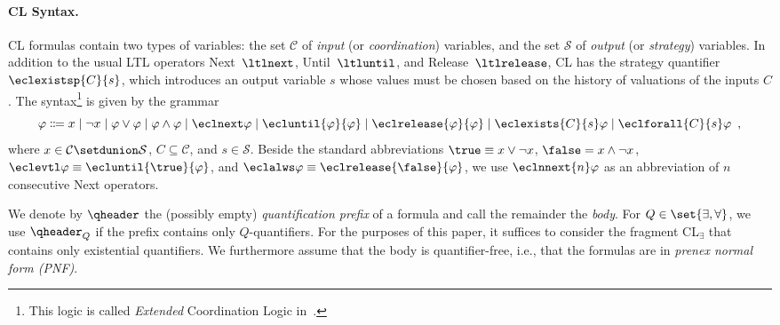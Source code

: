 \documentclass{LMCS}
\theoremstyle{plain}\newtheorem{theorem}[thm]{Theorem}
\theoremstyle{plain}\newtheorem{lemma}[thm]{Lemma}
\theoremstyle{plain}\newtheorem{proposition}[thm]{Proposition}
\theoremstyle{plain}\newtheorem{corollary}[thm]{Corollary}
\theoremstyle{definition}\newtheorem{definition}{Definition}[section]
\begin{document}
\paragraph{\bf CL Syntax.}
CL formulas contain two types of variables: the set $\mathcal{C}$ of \emph{input} (or \emph{coordination}) variables, and the set $\mathcal{S}$ of \emph{output} (or \emph{strategy}) variables.
In addition to the usual LTL operators Next~$\ltlnext$, Until~$\ltluntil$, and Release~$\ltlrelease$, CL has the strategy quantifier $\eclexistsp{C}{s}$, which introduces an output variable $s$ whose values must be chosen based on the history of valuations of the inputs $C$.
The syntax\footnote{This logic is called \emph{Extended} Coordination Logic in~\cite{DBLP:conf/csl/FinkbeinerS10}.} is given by the grammar
\begin{equation*} \label{eq:ecl_syntax}
\varphi \Coloneqq x \mid \neg x \mid \varphi \lor \varphi \mid \varphi \land \varphi \mid \eclnext \varphi \mid \ecluntil{\varphi}{\varphi} \mid \eclrelease{\varphi}{\varphi} \mid \eclexists{C}{s} \varphi \mid \eclforall{C}{s} \varphi \enspace ,
\end{equation*}
where $x \in \mathcal{C} \setdunion \mathcal{S}$, $C \subseteq \mathcal{C}$, and $s \in \mathcal{S}$.
Beside the standard abbreviations $\true \equiv x \lor \neg x$, $\false = x \land \neg x$, $\eclevtl \varphi \equiv \ecluntil{\true}{\varphi}$, and $\eclalws \varphi \equiv \eclrelease{\false}{\varphi}$, we use $\eclnnext{n} \varphi$ as an abbreviation of $n$ consecutive Next operators.

We denote by $\qheader$ the (possibly empty) \emph{quantification prefix} of a formula and call the remainder the \emph{body}.
For $Q \in \set{\exists,\forall}$, we use $\qheader_Q$ if the prefix contains only $Q$-quantifiers.
For the purposes of this paper, it suffices to consider the fragment CL$_\exists$ that contains only existential quantifiers.
We furthermore assume that the body is quantifier-free, i.e., that the formulas are in \emph{prenex normal form (PNF)}.
\end{document}
